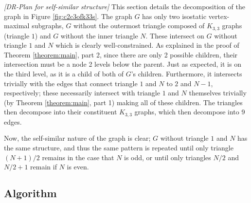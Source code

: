\myexample
\textsl{[DR-Plan for self-similar structure]}
This section details the decomposition of the graph in Figure \ref{fig:c2c3ofk33s}. The graph $G$ has only two isostatic vertex-maximal subgraphs, $G$ without the outermost triangle composed of $K_{3,3}$ graphs (triangle $1$) and $G$ without the inner triangle $N$. These intersect on $G$ without triangle $1$ and $N$ which is clearly well-constrained. As explained in the proof of Theorem \ref{theorem:main}, part 2, since there are only 2 possible children, their intersection must be a node 2 levels below the parent. Just as expected, it is on the third level, as it is a child of both of $G$'s children. Furthermore, it intersects trivially with the edges that connect triangle $1$ and $N$ to $2$ and $N-1$, respectively; these necessarily intersect with triangle $1$ and $N$ themselves trivially (by Theorem \ref{theorem:main}, part 1) making all of these children. The triangles then decompose into their constituent $K_{3,3}$ graphs, which then decompose into 9 edges.

Now, the self-similar nature of the graph is clear; $G$ without triangle $1$ and $N$ has the same structure, and thus the same pattern is repeated until only triangle $(N+1)/2$ remains in the case that $N$ is odd, or until only triangles $N/2$ and $N/2+1$ remain if $N$ is even.









\subsection{Algorithm}


